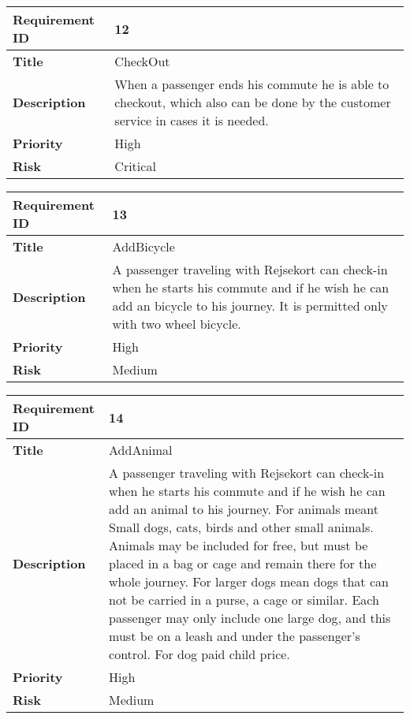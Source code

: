 \begin{center}
	\def\arraystretch{1.5}%
    \begin{tabular}{ | p{5cm} | p{5cm} |}
    \hline
    	\textbf{Requirement ID} & 12 \\ \hline
		\textbf{Title} & CheckOut\\ \hline
		\textbf{Description} & When a passenger ends his commute he is able to checkout, which also can be done by the customer service in cases it is needed.\\ \hline
		\textbf{Priority} & High\\ \hline
		\textbf{Risk} & Critical\\
      \hline
    \end{tabular}
\end{center}

\begin{center}
	\def\arraystretch{1.5}%
    \begin{tabular}{ | p{5cm} | p{5cm} |}
    \hline
    	\textbf{Requirement ID} & 13 \\ \hline
		\textbf{Title} & AddBicycle\\ \hline
		\textbf{Description} & A passenger traveling with Rejsekort can check-in when he starts his commute and if he wish he can add an bicycle to his journey. It is permitted only with two wheel bicycle.\\ \hline
		\textbf{Priority} & High\\ \hline
		\textbf{Risk} & Medium\\
      \hline
    \end{tabular}
\end{center}

\begin{center}
	\def\arraystretch{1.5}%
    \begin{tabular}{ | p{5cm} | p{5cm} |}
    \hline
    	\textbf{Requirement ID} & 14 \\ \hline
		\textbf{Title} & AddAnimal\\ \hline
		\textbf{Description} & A passenger traveling with Rejsekort can check-in when he starts his commute and if he wish he can add an animal to his journey. For animals meant Small dogs, cats, birds and other small animals. Animals may be included for free, but must be placed in a bag or cage and remain there for the whole journey. For larger dogs mean dogs that can not be carried in a purse, a cage or similar. Each passenger may only include one large dog, and this must be on a leash and under the passenger's control. For dog paid child price.\\ \hline
		\textbf{Priority} & High\\ \hline
		\textbf{Risk} & Medium\\
      \hline
    \end{tabular}
\end{center}


